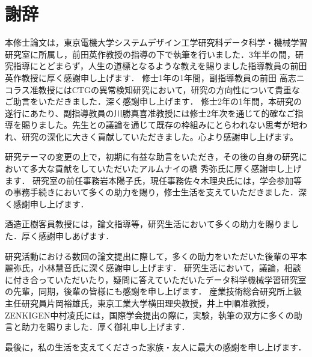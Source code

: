\chapter*{謝辞}
本修士論文は，東京電機大学システムデザイン工学研究科データ科学・機械学習研究室に所属し，前田英作教授の指導の下で執筆を行いました．3年半の間，研究指導にとどまらず，人生の道標となるような教えを賜りました指導教員の前田英作教授に厚く感謝申し上げます．
修士1年の1年間，副指導教員の前田 高志ニコラス准教授にはCTGの異常検知研究において，研究の方向性について貴重なご助言をいただきました．深く感謝申し上げます．
修士2年の1年間，本研究の遂行にあたり、副指導教員の川勝真喜准教授には修士2年次を通じて的確なご指導を賜りました。先生との議論を通じて既存の枠組みにとらわれない思考が培われ、研究の深化に大きく貢献していただきました。心より感謝申し上げます。

研究テーマの変更の上で，初期に有益な助言をいただき，その後の自身の研究において多大な貢献をしていただいたアルムナイの橋 秀弥氏に厚く感謝申し上げます．
研究室の前任事務岩本陽子氏，現任事務佐々木理央氏には，学会参加等の事務手続きにおいて多くの助力を賜り，修士生活を支えていただきました．深く感謝申し上げます．

酒造正樹客員教授には，論文指導等，研究生活において多くの助力を賜りました．厚く感謝申しあげます．

研究活動における数回の論文提出に際して，多くの助力をいただいた後輩の平本麗弥氏，小林慧音氏に深く感謝申し上げます．
研究生活において，議論，相談に付き合っていただいたり，疑問に答えていただいたデータ科学機械学習研究室の先輩，同期，後輩の皆様にも感謝を申し上げます．
産業技術総合研究所上級主任研究員片岡裕雄氏，東京工業大学横田理央教授，井上中順准教授，ZENKIGEN中村凌氏には，国際学会提出の際に，実験，執筆の双方に多くの助言と助力を賜りました．厚く御礼申し上げます．

最後に，私の生活を支えてくださった家族・友人に最大の感謝を申し上げます．

\newpage
